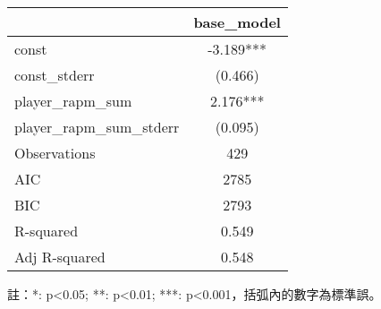 \documentclass{article}
\begin{document}
    \fontsize{12pt}{14pt}\selectfont
    
    \begin{tabular}{lc}
\toprule
 & base\_model \\
\midrule
const & -3.189*** \\
const\_stderr & (0.466) \\
player\_rapm\_sum & 2.176*** \\
player\_rapm\_sum\_stderr & (0.095) \\
\midrule
Observations &    429 \\
AIC &    2785 \\
BIC &    2793 \\
R-squared &    0.549 \\
Adj R-squared &    0.548 \\
\bottomrule
\end{tabular}

    
    \fontsize{11pt}{14pt}\selectfont
    註：*: p<0.05; **: p<0.01; ***: p<0.001，括弧內的數字為標準誤。
    
\end{document}
